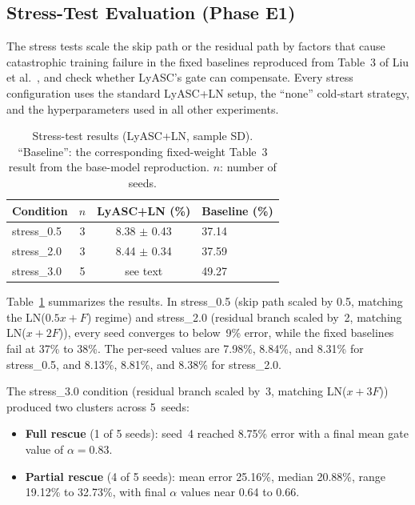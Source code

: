 \documentclass[conference,10pt]{IEEEtran}
\begin{document}
\subsection{Stress-Test Evaluation (Phase E1)}
\label{sec:stress}

The stress tests scale the skip path or the residual path by factors
that cause catastrophic training failure in the fixed baselines
reproduced from Table~3 of Liu et al.~\cite{liu2021rethinking}, and
check whether LyASC's gate can compensate. Every stress configuration
uses the standard LyASC+LN setup, the ``none'' cold-start strategy, and
the hyperparameters used in all other experiments.

\begin{table}[t]
\centering
\caption{Stress-test results (LyASC+LN, sample SD). ``Baseline'': the
corresponding fixed-weight Table~3 result from the base-model
reproduction. $n$: number of seeds.}
\label{tab:stress}
\begin{tabular}{lccl}
\toprule
Condition & $n$ & LyASC+LN (\%) & Baseline (\%) \\
\midrule
stress\_0.5 & 3 & 8.38 $\pm$ 0.43 & 37.14 \\
stress\_2.0 & 3 & 8.44 $\pm$ 0.34 & 37.59 \\
stress\_3.0 & 5 & see text         & 49.27 \\
\bottomrule
\end{tabular}
\end{table}

Table~\ref{tab:stress} summarizes the results. In stress\_0.5 (skip path
scaled by 0.5, matching the LN($0.5x+F$) regime) and stress\_2.0
(residual branch scaled by~2, matching LN($x+2F$)), every seed converges
to below~9\% error, while the fixed baselines fail at 37\% to 38\%. The
per-seed values are 7.98\%, 8.84\%, and 8.31\% for stress\_0.5, and
8.13\%, 8.81\%, and 8.38\% for stress\_2.0.

The stress\_3.0 condition (residual branch scaled by~3, matching
LN($x+3F$)) produced two clusters across 5~seeds:

\begin{itemize}
    \item \textbf{Full rescue} (1 of 5 seeds): seed~4 reached 8.75\%
    error with a final mean gate value of $\alpha = 0.83$.
    \item \textbf{Partial rescue} (4 of 5 seeds): mean error 25.16\%,
    median 20.88\%, range 19.12\% to 32.73\%, with final $\alpha$ values
    near 0.64 to 0.66.
\end{itemize}
\end{document}
